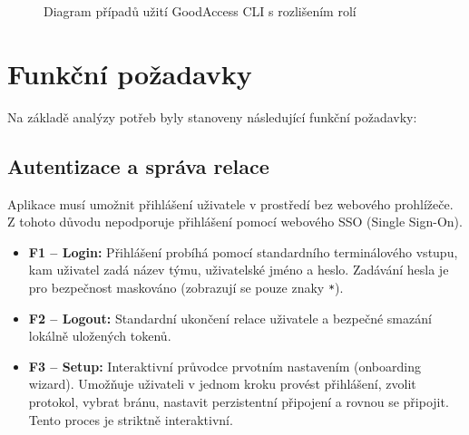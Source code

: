 \begin{figure}[H]
    \caption{Diagram případů užití GoodAccess CLI s rozlišením rolí}
    \label{fig:usecase}
\end{figure}

\section{Funkční požadavky}
\label{sec:funkcni_pozadavky}
Na základě analýzy potřeb byly stanoveny následující funkční požadavky:

\subsection{Autentizace a správa relace}
Aplikace musí umožnit přihlášení uživatele v prostředí bez webového prohlížeče. Z tohoto důvodu nepodporuje přihlášení pomocí webového SSO (Single Sign-On).
\begin{itemize}
    \item \textbf{F1 -- Login:} Přihlášení probíhá pomocí standardního terminálového vstupu, kam uživatel zadá název týmu, uživatelské jméno a heslo. Zadávání hesla je pro bezpečnost maskováno (zobrazují se pouze znaky \texttt{*}).
    \item \textbf{F2 -- Logout:} Standardní ukončení relace uživatele a bezpečné smazání lokálně uložených tokenů.
    \item \textbf{F3 -- Setup:} Interaktivní průvodce prvotním nastavením (onboarding wizard). Umožňuje uživateli v jednom kroku provést přihlášení, zvolit protokol, vybrat bránu, nastavit perzistentní připojení a rovnou se připojit. Tento proces je striktně interaktivní.
\end{itemize}

